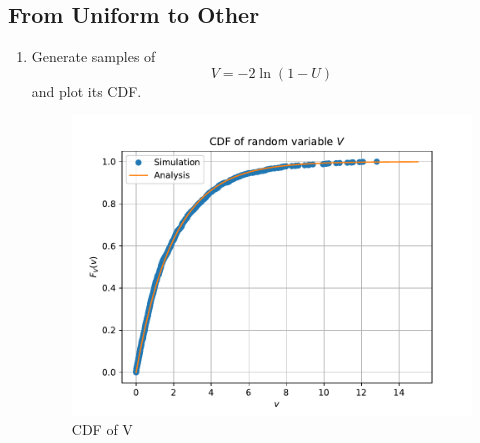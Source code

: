 \documentclass[10pt, a4paper]{article}
\providecommand{\brak}[1]{\ensuremath{\left(#1\right)}}
\begin{document}
\subsection{From Uniform to Other}
\begin{enumerate}
\item Generate samples of 
%
\begin{equation}
V = -2\ln\brak{1-U}
\label{eq:probman_V_cdf_sim}
\end{equation}
%
and plot its CDF.
\begin{figure}[!ht]
\centering
\includegraphics[scale=0.5]{images/5.3.pdf}
\caption{CDF of V}
\end{figure}

\begin{center}
\end{center}


\end{enumerate}
\end{document}
